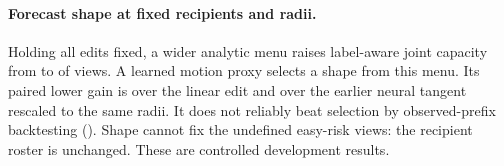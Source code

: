 \paragraph{Forecast shape at fixed recipients and radii.}
Holding all \RadiusShapeEdits{} edits fixed, a wider analytic menu raises
label-aware joint capacity from \RadiusShapeTiming{} to \RadiusShapeFull{}
of \RadiusShapeViews{} views. A learned motion proxy selects a shape
from this menu. Its paired lower gain is \RadiusShapeLinear{} over the
linear edit and \RadiusShapeTangent{} over the earlier neural tangent
rescaled to the same radii. It does not reliably beat selection by
observed-prefix backtesting (\RadiusShapePrefix{}). Shape cannot fix
the \RadiusShapeUndefined{} undefined easy-risk views: the recipient
roster is unchanged. These are controlled development results.
